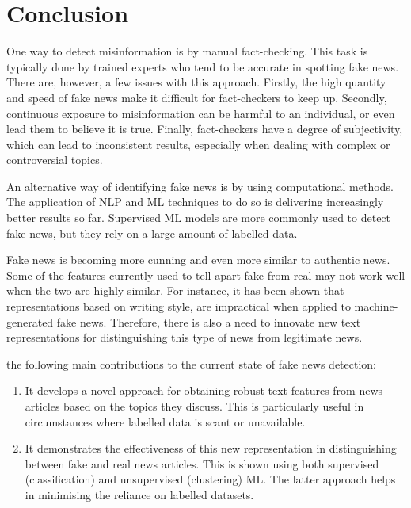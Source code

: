 \chapter{Conclusion}\label{ch:conclusion}

One way to detect misinformation is by manual fact-checking. This task is typically done by trained experts who tend to be accurate in spotting fake news. There are, however, a few issues with this approach. Firstly, the high quantity and speed of fake news make it difficult for fact-checkers to keep up. Secondly, continuous exposure to misinformation can be harmful to an individual, or even lead them to believe it is true. Finally, fact-checkers have a degree of subjectivity, which can lead to inconsistent results, especially when dealing with complex or controversial topics.

An alternative way of identifying fake news is by using computational methods. The application of \ac{NLP} and \ac{ML} techniques to do so is delivering increasingly better results so far. Supervised \ac{ML} models are more commonly used to detect fake news, but they rely on a large amount of labelled data.

Fake news is becoming more cunning and even more similar to authentic news. Some of the features currently used to tell apart fake from real may not work well when the two are highly similar. For instance, it has been shown that representations based on writing style, are impractical when applied to machine-generated fake news. Therefore, there is also a need to innovate new text representations for distinguishing this type of news from legitimate news.

 the following main contributions to the current state of fake news detection:

\begin{enumerate}
  \item It develops a novel approach for obtaining robust text features from news articles based on the topics they discuss. This is particularly useful in circumstances where labelled data is scant or unavailable.

  \item It demonstrates the effectiveness of this new representation in distinguishing between fake and real news articles. This is shown using both supervised (classification) and unsupervised (clustering) \ac{ML}. The latter approach helps in minimising the reliance on labelled datasets.
\end{enumerate}

